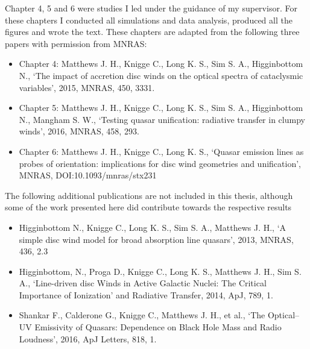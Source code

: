 \documentclass[a4paper, 11pt, twoside]{Thesis}  %
\begin{document}
{Chapter 4, 5 and 6 were studies I led under the guidance of my supervisor. For these
chapters I conducted all simulations and data analysis, produced all the figures and 
wrote the text. These chapters are adapted from the following three papers with permission
from MNRAS:
\begin{itemize}
	\item Chapter 4: Matthews J. H., Knigge C., Long K. S., Sim S. A., Higginbottom N., 
`The impact of accretion disc winds on the optical spectra of 
cataclysmic variables',
2015, MNRAS, 450, 3331.
	\item Chapter 5: Matthews J. H., Knigge C., Long K. S., Sim S. A., Higginbottom N., Mangham S. W., 
`Testing quasar unification: radiative transfer in clumpy winds',
2016, MNRAS, 458, 293.
	\item Chapter 6: Matthews J. H., Knigge C., Long K. S., `Quasar emission lines as probes of orientation: implications for disc wind geometries and unification', MNRAS, DOI:10.1093/mnras/stx231
\end{itemize}
The following additional publications are not included in this thesis, although some of the work 
presented here did contribute towards the respective results
\begin{itemize}
	\item Higginbottom N., Knigge C., Long K. S., Sim S. A., Matthews J. H., 
`A simple disc wind model for broad absorption line quasars', 2013,  
MNRAS, 436, 2.3
	\item Higginbottom, N., Proga D., Knigge C., Long K. S., Matthews J. H., Sim S. A.,
	`Line-driven disc Winds in Active Galactic Nuclei: The Critical Importance of Ionization' 
	and Radiative Transfer, 2014, ApJ, 789, 1.
	\item Shankar F., Calderone G., Knigge C., Matthews J. H., et al., `The Optical--UV Emissivity of Quasars: Dependence on Black Hole Mass and Radio Loudness', 2016, ApJ Letters, 818, 1.
\end{itemize} 

}
\clearpage  %

\end{document}
